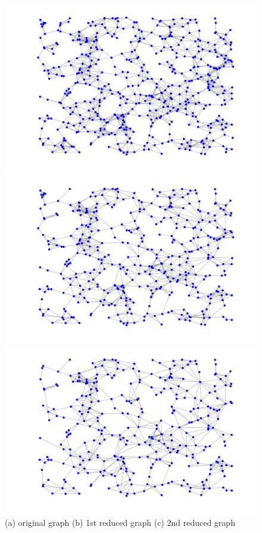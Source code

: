 \documentclass[a4paper]{article}
\begin{document}
\begin{figure}[H]
\centering
\includegraphics[width = 12 cm]{0629/graph}

\includegraphics[width = 12 cm]{0629/1st_downsampled}

\includegraphics[width = 12cm]{0629/2nd_downsampled}
\caption{ (a) original graph (b) 1st reduced graph (c) 2nd reduced graph}
\end{figure}
\end{document}
